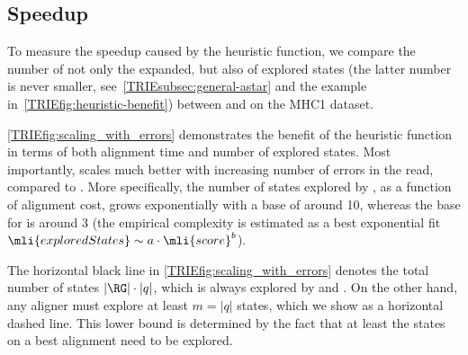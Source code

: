 \subsection{\A Speedup}
To measure the speedup caused by the heuristic function, we compare the number
of not only the expanded, but also of explored states (the latter number is
never smaller, see~\cref{TRIEsubsec:general-astar} and the example
in~\cref{TRIEfig:heuristic-benefit}) between \astarix and \dijkstra on the MHC1
dataset.

\cref{TRIEfig:scaling_with_errors} demonstrates the benefit of the heuristic
function in terms of both alignment time and number of explored states. Most
importantly, \astarix scales much better with increasing number of errors in the
read, compared to \dijkstra. More specifically, the number of states explored by
\dijkstra, as a function of alignment cost, grows exponentially with a base of 
around 10, whereas the base for \astarix is around 3 (the empirical complexity is
estimated as a best exponential fit \mbox{$\mli{exploredStates} \sim a \cdot
\mli{score}^b$}).

The horizontal black line in \cref{TRIEfig:scaling_with_errors} denotes the total
number of states $\lvert \RG \rvert \cdot \lvert q \rvert$, which is always
explored by \bitparallel and \pasgal. On the other hand, any aligner must
explore at least $m = \lvert q \rvert$ states, which we show as a horizontal
dashed line. This lower bound is determined by the fact that at least the states
on a best alignment need to be explored.


